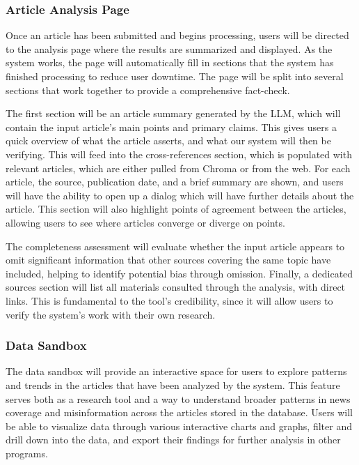 \documentclass[conference]{IEEEtran}
\begin{document}
\subsubsection{Article Analysis Page}
Once an article has been submitted and begins processing, users will be directed to the analysis page where the results are summarized and displayed. As the system works, the page will automatically fill in sections that the system has finished processing to reduce user downtime. The page will be split into several sections that work together to provide a comprehensive fact-check.

The first section will be an article summary generated by the LLM, which will contain the input article's main points and primary claims. This gives users a quick overview of what the article asserts, and what our system will then be verifying. This will feed into the cross-references section, which is populated with relevant articles, which are either pulled from Chroma or from the web. For each article, the source, publication date, and a brief summary are shown, and users will have the ability to open up a dialog which will have further details about the article. This section will also highlight points of agreement between the articles, allowing users to see where articles converge or diverge on points.

The completeness assessment will evaluate whether the input article appears to omit significant information that other sources covering the same topic have included, helping to identify potential bias through omission. Finally, a dedicated sources section will list all materials consulted through the analysis, with direct links. This is fundamental to the tool's credibility, since it will allow users to verify the system's work with their own research.

\subsubsection{Data Sandbox}
The data sandbox will provide an interactive space for users to explore patterns and trends in the articles that have been analyzed by the system. This feature serves both as a research tool and a way to understand broader patterns in news coverage and misinformation across the articles stored in the database. Users will be able to visualize data through various interactive charts and graphs, filter and drill down into the data, and export their findings for further analysis in other programs.
\end{document}
